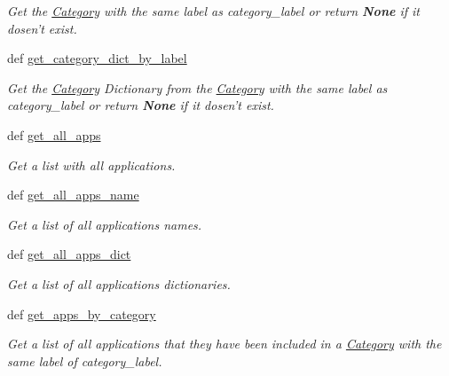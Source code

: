 \begin{CompactItemize}
\begin{CompactList}\small\item\em Get the \hyperlink{classwinsollib_1_1Category}{Category} with the same label as {\em category\_\-label\/} or return {\bf None} if it dosen't exist. \item\end{CompactList}\item 
def \hyperlink{classwinsollib_1_1Image_2d0838bb9795f27dee544e36f63c2d4c}{get\_\-category\_\-dict\_\-by\_\-label}
\begin{CompactList}\small\item\em Get the \hyperlink{classwinsollib_1_1Category}{Category} Dictionary from the \hyperlink{classwinsollib_1_1Category}{Category} with the same label as {\em category\_\-label\/} or return {\bf None} if it dosen't exist. \item\end{CompactList}\item 
def \hyperlink{classwinsollib_1_1Image_843aed24a4897540551ddea5635b8717}{get\_\-all\_\-apps}
\begin{CompactList}\small\item\em Get a list with all applications. \item\end{CompactList}\item 
def \hyperlink{classwinsollib_1_1Image_a35d3730e224b170900b56c6c47734a7}{get\_\-all\_\-apps\_\-name}
\begin{CompactList}\small\item\em Get a list of all applications names. \item\end{CompactList}\item 
def \hyperlink{classwinsollib_1_1Image_65153a650cfb8b15c1abef650016bedb}{get\_\-all\_\-apps\_\-dict}
\begin{CompactList}\small\item\em Get a list of all applications dictionaries. \item\end{CompactList}\item 
def \hyperlink{classwinsollib_1_1Image_719fa59039a7e4a67e0a29a28e3bd5be}{get\_\-apps\_\-by\_\-category}
\begin{CompactList}\small\item\em Get a list of all applications that they have been included in a \hyperlink{classwinsollib_1_1Category}{Category} with the same label of {\em category\_\-label\/}. \item\end{CompactList}\item 

\end{CompactItemize}
